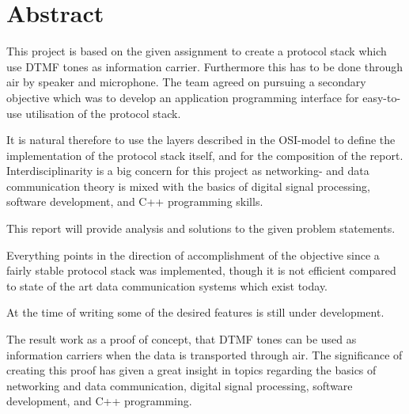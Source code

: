 \chapter*{Abstract}
This project is based on the given assignment to create a protocol stack which
use DTMF tones as information carrier. Furthermore this has to be done through air
by speaker and microphone. The team agreed on pursuing a secondary objective which
was to develop an application programming interface for easy-to-use utilisation of
the protocol stack.

It is natural therefore to use the layers described in the OSI-model to define
the implementation of the protocol stack itself, and for the composition of the report.
Interdisciplinarity is a big concern for this project as networking- and data communication
theory is mixed with the basics of digital signal processing, software development,
and C++ programming skills. 

This report will provide analysis and solutions to the given problem statements.

Everything points in the direction of accomplishment of the objective since a fairly stable 
protocol stack was implemented, though it is not efficient compared to state of the art
data communication systems which exist today. 

At the time of writing some of the desired features is still under development.

The result work as a proof of concept, that DTMF tones can be used as information carriers
when the data is transported through air. The significance of creating this proof has given a
great insight in topics regarding the basics of networking and data communication,
digital signal processing, software development, and C++ programming.